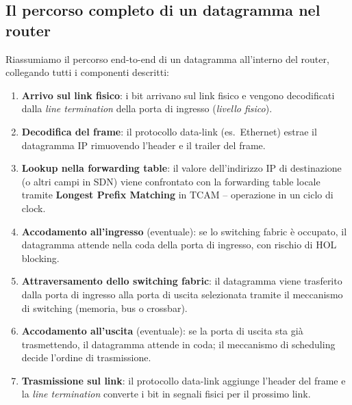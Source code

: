 \documentclass[a4paper,12pt]{report}
\begin{document}
\newpage
\subsection{Il percorso completo di un datagramma nel router}

Riassumiamo il percorso end-to-end di un datagramma all'interno del router,
collegando tutti i componenti descritti:

\begin{enumerate}
    \item \textbf{Arrivo sul link fisico}: i bit arrivano sul link fisico
          e vengono decodificati dalla \textit{line termination} della
          porta di ingresso (\textit{livello fisico}).
    \item \textbf{Decodifica del frame}: il protocollo data-link (es.\
          Ethernet) estrae il datagramma IP rimuovendo l'header e il
          trailer del frame.
    \item \textbf{Lookup nella forwarding table}: il valore dell'indirizzo
          IP di destinazione (o altri campi in SDN) viene confrontato con
          la forwarding table locale tramite \textbf{Longest Prefix
          Matching} in TCAM -- operazione in un ciclo di clock.
    \item \textbf{Accodamento all'ingresso} (eventuale): se lo switching
          fabric è occupato, il datagramma attende nella coda della porta
          di ingresso, con rischio di HOL blocking.
    \item \textbf{Attraversamento dello switching fabric}: il datagramma
          viene trasferito dalla porta di ingresso alla porta di uscita
          selezionata tramite il meccanismo di switching (memoria, bus
          o crossbar).
    \item \textbf{Accodamento all'uscita} (eventuale): se la porta di
          uscita sta già trasmettendo, il datagramma attende in coda;
          il meccanismo di scheduling decide l'ordine di trasmissione.
    \item \textbf{Trasmissione sul link}: il protocollo data-link aggiunge
          l'header del frame e la \textit{line termination} converte i
          bit in segnali fisici per il prossimo link.
\end{enumerate}
\end{document}
